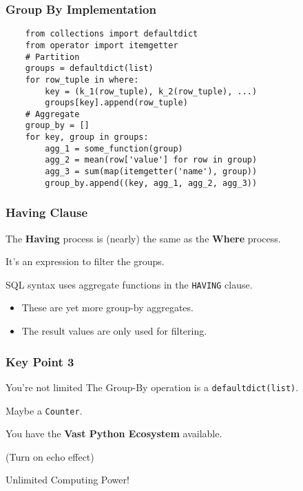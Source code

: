 \documentclass{beamer}
\begin{document}
\begin{frame}[fragile]
    \frametitle{Group By Implementation}

    \begin{verbatim}
    from collections import defaultdict
    from operator import itemgetter
    # Partition
    groups = defaultdict(list)
    for row_tuple in where:
        key = (k_1(row_tuple), k_2(row_tuple), ...)
        groups[key].append(row_tuple)
    # Aggregate
    group_by = []
    for key, group in groups:
        agg_1 = some_function(group)
        agg_2 = mean(row['value'] for row in group)
        agg_3 = sum(map(itemgetter('name'), group))
        group_by.append((key, agg_1, agg_2, agg_3))
    \end{verbatim}

\end{frame}

\begin{frame}
    \frametitle{Having Clause}

    The \textbf{Having} process is (nearly) the same as the \textbf{Where} process.

    It's an expression to filter the groups.

    \vspace{1em}

    SQL syntax uses aggregate functions in the \texttt{HAVING} clause.

    \begin{itemize}
        \item These are yet more group-by aggregates.

        \item The result values are only used for filtering.
    \end{itemize}

\end{frame}

\begin{frame}
    \frametitle{Key Point 3}

        \begin{block}{You're not limited}
        The Group-By operation is a \texttt{defaultdict(list)}.

        Maybe a \texttt{Counter}.

        \vspace{1em}
        You have the \textbf{Vast Python Ecosystem} available.
        \pause

        \vspace{1em}
        (Turn on echo effect)

        \Large{Unlimited Computing Power!}
    \end{block}

\end{frame}
\end{document}
